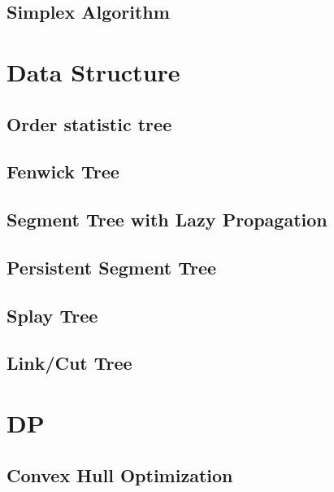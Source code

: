 \documentclass[10pt,landscape,a4paper,twocolumn]{article}
\begin{document}
\subsection{Simplex Algorithm}



\section{Data Structure}

\subsection{Order statistic tree}


\subsection{Fenwick Tree}


\subsection{Segment Tree with Lazy Propagation}


\subsection{Persistent Segment Tree}


\subsection{Splay Tree}


\subsection{Link/Cut Tree}


\section{DP}

\subsection{Convex Hull Optimization}
\end{document}
